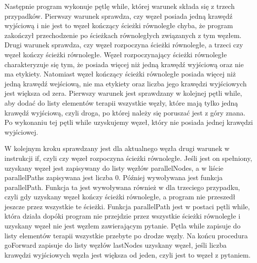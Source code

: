 Następnie program wykonuje pętlę while, której warunek składa się z trzech przypadków. 
Pierwszy warunek sprawdza, czy węzeł posiada jedną krawędź wyjściową i nie jest to węzeł kończący ścieżki równoległe chyba, że program zakończył przechodzenie po ścieżkach równoległych związanych z tym węzłem. 
Drugi warunek sprawdza, czy węzeł rozpoczyna ścieżki równoległe, a trzeci czy węzeł kończy ścieżki równoległe. Węzeł rozpoczynający ścieżki równoległe charakteryzuje się tym, że posiada więcej niż jedną krawędź wyjściową oraz nie ma etykiety. Natomiast węzeł kończący ścieżki równoległe posiada więcej niż jedną krawędź wejściową, nie ma etykiety oraz liczba jego krawędzi wyjściowych jest większa od zera. 
Pierwszy warunek jest sprawdzany w kolejnej pętli while, aby dodać do listy elementów terapii wszystkie węzły, które mają tylko jedną krawędź wyjściową, czyli droga, po której należy się poruszać jest z góry znana. 
Po wykonaniu tej pętli while uzyskujemy węzeł, który nie posiada jednej krawędzi wyjściowej.

W kolejnym kroku sprawdzany jest dla aktualnego węzła drugi warunek w instrukcji if, czyli czy węzeł rozpoczyna ścieżki równoległe. Jeśli jest on spełniony, uzyskany węzeł jest zapisywany do listy węzłów parallelNodes, 
a w liście parallelPaths zapisywana jest liczba 0. Później wywoływana jest funkcja parallelPath. Funkcja ta jest wywoływana również w dla trzeciego przypadku, czyli gdy uzyskany węzeł kończy ścieżki równoległe, a program nie przeszedł jeszcze przez wszystkie te ścieżki. 
Funkcja parallelPath jest w postaci pętli while, która działa dopóki program nie przejdzie przez wszystkie ścieżki równoległe i uzyskany węzeł nie jest węzłem zawierającym pytanie. Pętla while zapisuje do listy elementów terapii wszystkie przebyte po drodze węzły. Na końcu procedura goForward zapisuje do listy węzłów lastNodes uzyskany węzeł, jeśli liczba krawędzi wyjściowych węzła jest większa od jeden, czyli jest to węzeł z pytaniem.

